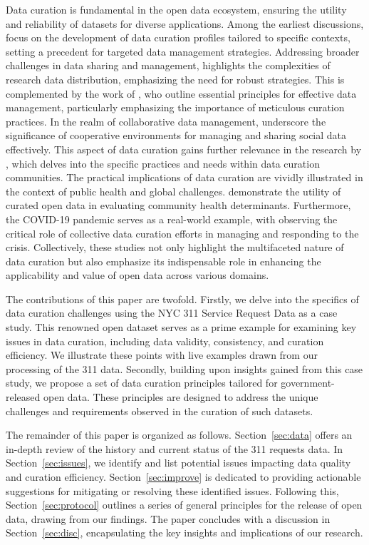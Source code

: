 \documentclass[12pt, titlepage]{article}
\begin{document}
Data curation is fundamental in the open data ecosystem, ensuring the
utility and reliability of datasets for diverse applications. Among
the earliest discussions, \citet{witt2009constructing} focus on the
development of data curation profiles tailored to specific contexts,
setting a precedent for targeted data management
strategies. Addressing broader challenges in data sharing and
management, \citet{borgman2012conundrum} highlights the complexities
of research data distribution, emphasizing the need for robust
strategies. This is complemented by the work of \citet{hart2016ten},
who outline essential principles for effective data management,
particularly emphasizing the importance of meticulous curation
practices. In the realm of collaborative data management,
\citet{beheshti2019datasynapse} underscore the significance of
cooperative environments for managing and sharing social data
effectively. This aspect of data curation gains further relevance in
the research by \citet{mclure2014data}, which delves into the specific
practices and needs within data curation communities. The practical
implications of data curation are vividly illustrated in the context
of public health and global challenges. \citet{cantor2018facets}
demonstrate the utility of curated open data in evaluating community
health determinants. Furthermore, the COVID-19 pandemic serves as a
real-world example, with \citet{shankar2021data} observing the
critical role of collective data curation efforts in managing and
responding to the crisis. Collectively, these studies not only
highlight the multifaceted nature of data curation but also emphasize
its indispensable role in enhancing the applicability and value of
open data across various domains.


The contributions of this paper are twofold. Firstly, we delve into
the specifics of data curation challenges using the NYC 311 Service
Request Data as a case study. This renowned open dataset serves as a
prime example for examining key issues in data curation, including
data validity, consistency, and curation efficiency. We illustrate
these points with live examples drawn from our processing of the 311
data. Secondly, building upon insights gained from this case study, we
propose a set of data curation principles tailored for
government-released open data. These principles are designed to
address the unique challenges and requirements observed in the
curation of such datasets.


The remainder of this paper is organized as
follows. Section~\ref{sec:data} offers an in-depth review of the
history and current status of the 311 requests data. In
Section~\ref{sec:issues}, we identify and list potential issues
impacting data quality and curation
efficiency. Section~\ref{sec:improve} is dedicated to providing
actionable suggestions for mitigating or resolving these identified
issues. Following this, Section~\ref{sec:protocol} outlines a series
of general principles for the release of open data, drawing from our
findings. The paper concludes with a discussion in
Section~\ref{sec:disc}, encapsulating the key insights and
implications of our research.
\end{document}
